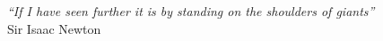 \cleardoublepage
\thispagestyle{plain}

\vspace*{8cm}

\begin{flushright}
  \textsl{``If I have seen further it is by standing on the shoulders of giants''} \\
	\vspace*{1.5cm}
	Sir Isaac Newton
\end{flushright}

